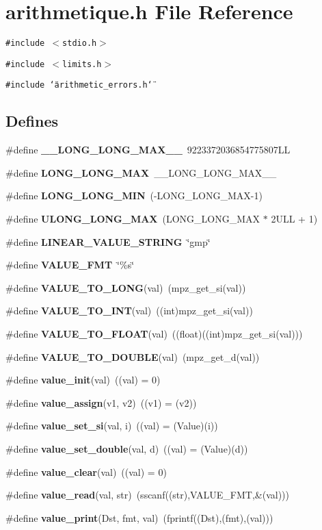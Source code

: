 \section{arithmetique.h File Reference}
\label{arithmetique_8h}
{\tt \#include $<$stdio.h$>$}\par
{\tt \#include $<$limits.h$>$}\par
{\tt \#include \char`\"{}arithmetic\_\-errors.h\char`\"{}}\par
\subsection*{Defines}
\begin{CompactItemize}
\item 
\#define {\bf \_\-\_\-LONG\_\-LONG\_\-MAX\_\-\_\-}\ 9223372036854775807LL
\item 
\#define {\bf LONG\_\-LONG\_\-MAX}\ \_\-\_\-LONG\_\-LONG\_\-MAX\_\-\_\-
\item 
\#define {\bf LONG\_\-LONG\_\-MIN}\ (-LONG\_\-LONG\_\-MAX-1)
\item 
\#define {\bf ULONG\_\-LONG\_\-MAX}\ (LONG\_\-LONG\_\-MAX $\ast$ 2ULL + 1)
\item 
\#define {\bf LINEAR\_\-VALUE\_\-STRING}\ \char`\"{}gmp\char`\"{}
\item 
\#define {\bf VALUE\_\-FMT}\ \char`\"{}\%s\char`\"{}
\item 
\#define {\bf VALUE\_\-TO\_\-LONG}(val)\ (mpz\_\-get\_\-si(val))
\item 
\#define {\bf VALUE\_\-TO\_\-INT}(val)\ ((int)mpz\_\-get\_\-si(val))
\item 
\#define {\bf VALUE\_\-TO\_\-FLOAT}(val)\ ((float)((int)mpz\_\-get\_\-si(val)))
\item 
\#define {\bf VALUE\_\-TO\_\-DOUBLE}(val)\ (mpz\_\-get\_\-d(val))
\item 
\#define {\bf value\_\-init}(val)\ ((val) = 0)
\item 
\#define {\bf value\_\-assign}(v1, v2)\ ((v1)  = (v2))
\item 
\#define {\bf value\_\-set\_\-si}(val, i)\ ((val) = (Value)(i))
\item 
\#define {\bf value\_\-set\_\-double}(val, d)\ ((val) = (Value)(d))
\item 
\#define {\bf value\_\-clear}(val)\ ((val) = 0)
\item 
\#define {\bf value\_\-read}(val, str)\ (sscanf((str),VALUE\_\-FMT,\&(val)))
\item 
\#define {\bf value\_\-print}(Dst, fmt, val)\ (fprintf((Dst),(fmt),(val)))

\end{CompactItemize}
